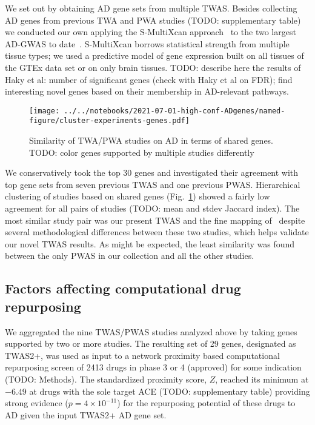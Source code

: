 \documentclass[letterpaper]{article}
\begin{document}
We set out by obtaining AD gene sets from multiple TWAS.  Besides collecting
AD genes from previous TWA and PWA studies (TODO: supplementary table) we
conducted our own applying the S-MultiXcan approach~\citep{Barbeira2018} to
the two largest AD-GWAS to date~\citep{Schwartzentruber2021,Wightman2021}.
S-MultiXcan borrows statistical strength from multiple tissue types; we used a
predictive model of gene expression built on all tissues of the GTEx data set
or on only brain tissues.  TODO: describe here the results of Haky et al:
number of significant genes (check with Haky et al on FDR); find interesting
novel genes based on their membership in AD-relevant pathways.

\begin{figure}
\texttt{[image: ../../notebooks/2021-07-01-high-conf-ADgenes/named-figure/cluster-experiments-genes.pdf]}
\caption{
Similarity of TWA/PWA studies on AD in terms of shared genes.
  TODO: color genes supported by multiple studies differently
}
\label{fig:twas-clustermap}
\end{figure}

We conservatively took the top 30 genes and investigated their agreement with
top gene sets from seven previous TWAS and one previous PWAS.  Hierarchical
clustering of studies based on shared genes (Fig.~\ref{fig:twas-clustermap})
showed a fairly low agreement for all pairs of studies (TODO: mean and stdev
Jaccard index).  The most similar study pair was our present TWAS and the fine
mapping of~\cite{Jansen2019} despite several methodological differences
between these two studies, which helps validate our novel TWAS results.  As
might be expected, the least similarity was found between the only PWAS in our
collection and all the other studies.

\subsection{Factors affecting computational drug repurposing}

We aggregated the nine TWAS/PWAS studies analyzed above by taking genes
supported by two or more studies.  The resulting set of 29 genes, designated
as TWAS2+, was used as input to a network proximity based computational
repurposing screen of 2413 drugs in phase 3 or 4 (approved) for some
indication (TODO: Methods).  The standardized proximity score, $Z$, reached
its minimum at $-6.49$ at drugs with the sole target ACE (TODO: supplementary
table) providing strong evidence ($p=4\times 10^{-11}$) for the repurposing
potential of these drugs to AD given the input TWAS2+ AD gene set.
\end{document}
